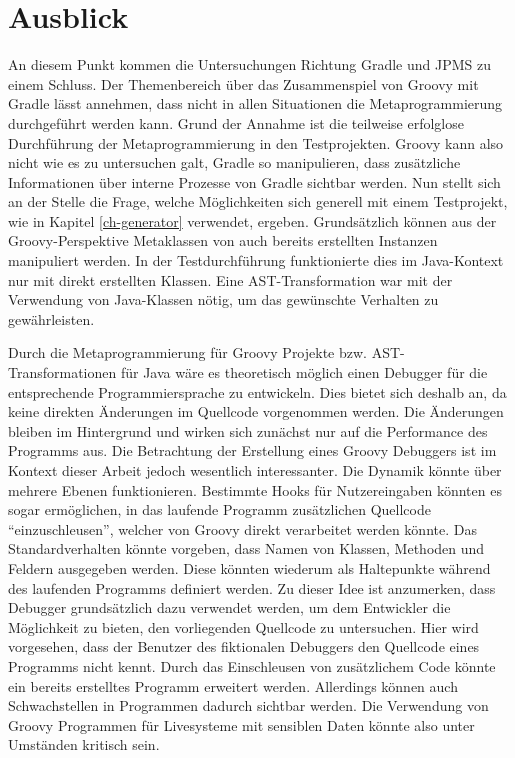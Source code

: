 
\section{Ausblick}
\label{ch-outlook}

An diesem Punkt kommen die Untersuchungen Richtung Gradle und JPMS zu einem Schluss.
Der Themenbereich über das Zusammenspiel von Groovy mit Gradle lässt annehmen, dass nicht in allen Situationen die Metaprogrammierung durchgeführt werden kann.
Grund der Annahme ist die teilweise erfolglose Durchführung der Metaprogrammierung in den Testprojekten.
Groovy kann also nicht wie es zu untersuchen galt, Gradle so manipulieren, dass zusätzliche Informationen über interne Prozesse von Gradle sichtbar werden.
Nun stellt sich an der Stelle die Frage, welche Möglichkeiten sich generell mit einem Testprojekt, wie in Kapitel \ref{ch-generator} verwendet, ergeben.
Grundsätzlich können aus der Groovy-Perspektive Metaklassen von auch bereits erstellten Instanzen manipuliert werden. 
In der Testdurchführung funktionierte dies im Java-Kontext nur mit direkt erstellten Klassen. 
Eine AST-Transformation war mit der Verwendung von Java-Klassen nötig, um das gewünschte Verhalten zu gewährleisten.

Durch die Metaprogrammierung für Groovy Projekte bzw. AST-Transformationen für Java wäre es theoretisch möglich einen Debugger für die entsprechende Programmiersprache zu entwickeln.
Dies bietet sich deshalb an, da keine direkten Änderungen im Quellcode vorgenommen werden. 
Die Änderungen bleiben im Hintergrund und wirken sich zunächst nur auf die Performance des Programms aus.
Die Betrachtung der Erstellung eines Groovy Debuggers ist im Kontext dieser Arbeit jedoch wesentlich interessanter.
Die Dynamik könnte über mehrere Ebenen funktionieren. 
Bestimmte Hooks für Nutzereingaben könnten es sogar ermöglichen, in das laufende Programm zusätzlichen Quellcode \enquote{einzuschleusen}, welcher von Groovy direkt verarbeitet werden könnte.
Das Standardverhalten könnte vorgeben, dass Namen von Klassen, Methoden und Feldern ausgegeben werden.
Diese könnten wiederum als Haltepunkte während des laufenden Programms definiert werden.
Zu dieser Idee ist anzumerken, dass Debugger grundsätzlich dazu verwendet werden, um dem Entwickler die Möglichkeit zu bieten, den vorliegenden Quellcode zu untersuchen.
Hier wird vorgesehen, dass der Benutzer des fiktionalen Debuggers den Quellcode eines Programms nicht kennt.
Durch das Einschleusen von zusätzlichem Code könnte ein bereits erstelltes Programm erweitert werden. 
Allerdings können auch Schwachstellen in Programmen dadurch sichtbar werden.
Die Verwendung von Groovy Programmen für Livesysteme mit sensiblen Daten könnte also unter Umständen kritisch sein.

